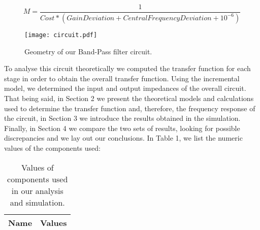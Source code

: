 \begin{equation}
\label{eqn:merit}
M=\frac{1}{Cost*(Gain Deviation + Central Frequency Deviation + 10^{-6})}
\end{equation}

\begin{figure}[h] \centering
\texttt{[image: circuit.pdf]}
\caption{Geometry of our Band-Pass filter circuit.}
\end{figure}

To analyse this circuit theoretically we computed the transfer function for each stage in order to obtain the overall transfer function. Using the incremental model, we determined the input and output impedances of the overall circuit.
That being said, in Section 2 we present the theoretical models and calculations used to determine the transfer function and, therefore, the frequency response of the circuit, in Section 3 we introduce the results obtained in the simulation. Finally, in Section 4 we compare the two sets of results, looking for possible discrepancies and we lay out our conclusions.
In Table 1, we list the numeric values of the components used:

\begin{table}[h]
  \centering
  \begin{tabular}{|l|r|}
    \hline    
    {\bf Name} & {\bf Values} \\ \hline
     
  \end{tabular}
  \caption{Values of components used in our analysis and simulation.}
  \label{tab:data}
\end{table}
